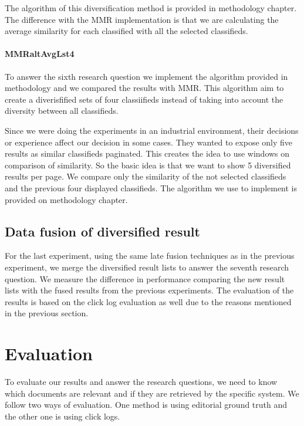 The algorithm of this diversification method is provided in methodology chapter. The difference with the MMR implementation is that we are calculating the average similarity for each classified with all the selected classifieds.

 \paragraph{MMRaltAvgLst4}

To answer the sixth research question we implement the algorithm provided in methodology and we compared the results with MMR. This algorithm aim to create a diverisfified sets of four classiifieds instead of taking into account the diversity between all classifieds.

Since we were doing the experiments in an industrial environment, their decisions or experience affect our decision in some cases. They wanted to expose only five results as similar classifieds paginated. This creates the idea to use windows on comparison of similarity. So the basic idea is that we want to show 5 diversified results per page. We compare only the similarity of the not selected classifieds and the previous four displayed classifieds. The algorithm we use to implement is provided on methodology chapter.

\subsection{Data fusion of diversified result}
For the last experiment, using the same late fusion techniques as in the previous experiment, we merge the diversified result lists to answer the seventh research question. We measure the difference in performance comparing the new result lists with the fused results from the previous experiments. The evaluation of the results is based on the click log evaluation as well due to the reasons mentioned in the previous section.




\section{Evaluation}

To evaluate our results and answer the research questions, we need to know which documents are relevant and if they are retrieved by the specific system. We follow two ways of evaluation. One method is using editorial ground truth and the other one is using click logs.

